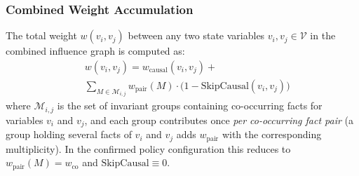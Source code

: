 \documentclass[twocolumn,10pt]{article}
\begin{document}
\subsubsection{Combined Weight Accumulation}
The total weight $w(v_i, v_j)$ between any two state variables $v_i, v_j \in \mathcal{V}$ in the combined influence graph is computed as:
\begin{equation}
\begin{aligned}
    &\ w(v_i, v_j) = w_{\text{causal}}(v_i, v_j) + \\
    &\ \sum_{M \in \mathcal{M}_{i,j}} w_{\text{pair}}(M) \cdot \bigl(1 - \text{SkipCausal}(v_i, v_j)\bigr)
\end{aligned}
\label{eq:total_weight}
\end{equation}
where $\mathcal{M}_{i,j}$ is the set of invariant groups containing co-occurring facts for variables $v_i$ and $v_j$, and each group contributes once \emph{per co-occurring fact pair} (a group holding several facts of $v_i$ and $v_j$ adds $w_{\text{pair}}$ with the corresponding multiplicity). In the confirmed policy configuration this reduces to $w_{\text{pair}}(M) = w_{\text{co}}$ and $\text{SkipCausal} \equiv 0$.
\end{document}
